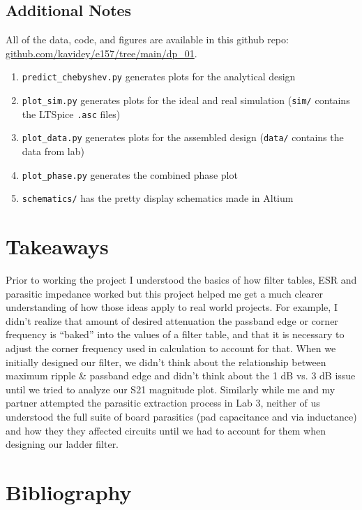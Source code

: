 \documentclass[letterpaper,12pt]{article}
\begin{document}
\subsection{Additional Notes}
All of the data, code, and figures are available in this github repo: \url{github.com/kavidey/e157/tree/main/dp_01}.
\begin{enumerate}
  \item \texttt{predict\_chebyshev.py} generates plots for the analytical design
  \item \texttt{plot\_sim.py} generates plots for the ideal and real simulation (\texttt{sim/} contains the LTSpice \texttt{.asc} files)
  \item \texttt{plot\_data.py} generates plots for the assembled design (\texttt{data/} contains the data from lab)
  \item \texttt{plot\_phase.py} generates the combined phase plot
  \item \texttt{schematics/} has the pretty display schematics made in Altium
\end{enumerate}

\newpage
\section{Takeaways}
\indent Prior to working the project I understood the basics of how filter tables, ESR and parasitic impedance worked but this project helped me get a much clearer understanding of how those ideas apply to real world projects.
For example, I didn't realize that amount of desired attenuation the passband edge or corner frequency is ``baked'' into the values of a filter table, and that it is necessary to adjust the corner frequency used in calculation to account for that. When we initially designed our filter, we didn't think about the relationship between maximum ripple \& passband edge and didn't think about the 1 dB vs. 3 dB issue until we tried to analyze our S21 magnitude plot.
Similarly while me and my partner attempted the parasitic extraction process in Lab 3, neither of us understood the full suite of board parasitics (pad capacitance and via inductance) and how they they affected circuits until we had to account for them when designing our ladder filter.

\newpage
\section{Bibliography}
\printbibliography
\end{document}

